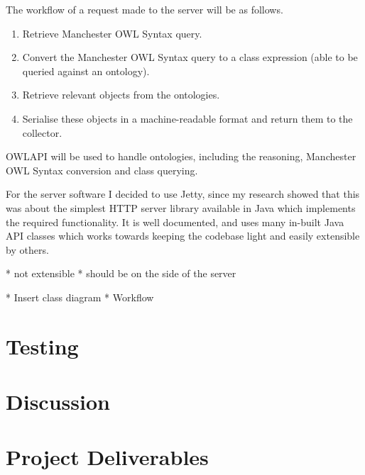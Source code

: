 \documentclass{article}
\begin{document}
The workflow of a request made to the server will be as follows. 

\begin{enumerate}
    \item Retrieve Manchester OWL Syntax query.
    \item Convert the Manchester OWL Syntax query to a class expression (able to
    be queried against an ontology).
    \item Retrieve relevant objects from the ontologies.
    \item Serialise these objects in a machine-readable format and return them 
    to the collector.
\end{enumerate}

OWLAPI will be used to handle ontologies, including the reasoning, Manchester
OWL Syntax conversion and class querying. 

For the server software I decided to use Jetty, since my research showed that
this was about the simplest HTTP server library available in Java which
implements the required functionality. It is well documented, and uses many
in-built Java API classes which works towards keeping the codebase light and
easily extensible by others. 

* not extensible
* should be on the side of the server

* Insert class diagram
* Workflow

\section{Testing}

\section{Discussion}

\section{Project Deliverables}
\end{document}
